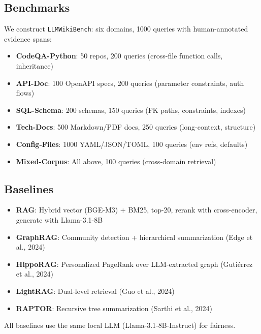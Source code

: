 \subsection{Benchmarks}
We construct \texttt{LLMWikiBench}: six domains, 1000 queries with human-annotated evidence spans:
\begin{itemize}
  \item \textbf{CodeQA-Python}: 50 repos, 200 queries (cross-file function calls, inheritance)
  \item \textbf{API-Doc}: 100 OpenAPI specs, 200 queries (parameter constraints, auth flows)
  \item \textbf{SQL-Schema}: 200 schemas, 150 queries (FK paths, constraints, indexes)
  \item \textbf{Tech-Docs}: 500 Markdown/PDF docs, 250 queries (long-context, structure)
  \item \textbf{Config-Files}: 1000 YAML/JSON/TOML, 100 queries (env refs, defaults)
  \item \textbf{Mixed-Corpus}: All above, 100 queries (cross-domain retrieval)
\end{itemize}

\subsection{Baselines}
\begin{itemize}
  \item \textbf{RAG}: Hybrid vector (BGE-M3) + BM25, top-20, rerank with cross-encoder, generate with Llama-3.1-8B
  \item \textbf{GraphRAG}: Community detection + hierarchical summarization (Edge et al., 2024)
  \item \textbf{HippoRAG}: Personalized PageRank over LLM-extracted graph (Guti{\'e}rrez et al., 2024)
  \item \textbf{LightRAG}: Dual-level retrieval (Guo et al., 2024)
  \item \textbf{RAPTOR}: Recursive tree summarization (Sarthi et al., 2024)
\end{itemize}
All baselines use the same local LLM (Llama-3.1-8B-Instruct) for fairness.


